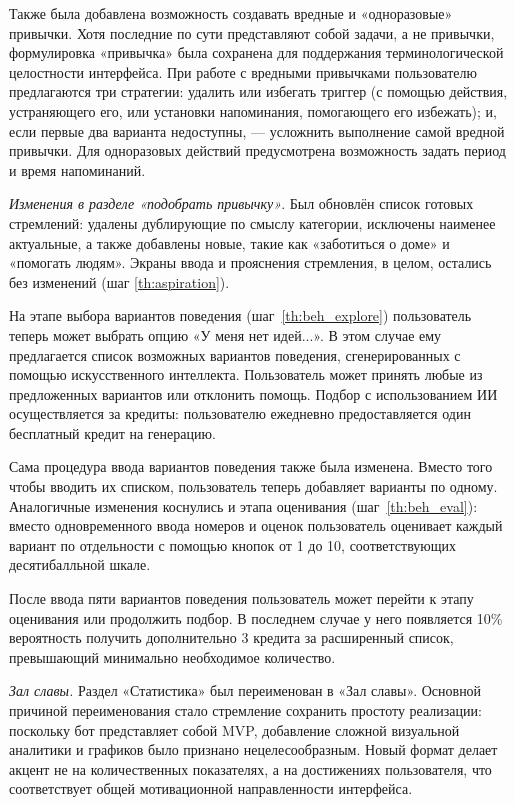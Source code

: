 \documentclass[pdflatex,sn-mathphys-num]{sn-jnl}%
\theoremstyle{thmstyleone}%
\theoremstyle{thmstyletwo}%
\theoremstyle{thmstylethree}%
\begin{document}
Также была добавлена возможность создавать вредные и «одноразовые» привычки. Хотя последние по сути представляют собой задачи, а не привычки, формулировка «привычка» была сохранена для поддержания терминологической целостности интерфейса. При работе с вредными привычками пользователю предлагаются три стратегии: удалить или избегать триггер (с помощью действия, устраняющего его, или установки напоминания, помогающего его избежать); и, если первые два варианта недоступны, — усложнить выполнение самой вредной привычки. Для одноразовых действий предусмотрена возможность задать период и время напоминаний.

\textit{Изменения в разделе «подобрать привычку»}. Был обновлён список готовых стремлений: удалены дублирующие по смыслу категории, исключены наименее актуальные, а также добавлены новые, такие как «заботиться о доме» и «помогать людям». Экраны ввода и прояснения стремления, в целом, остались без изменений (шаг \ref{th:aspiration}).

На этапе выбора вариантов поведения (шаг~\ref{th:beh_explore}) пользователь теперь может выбрать опцию «У меня нет идей...». В этом случае ему предлагается список возможных вариантов поведения, сгенерированных с помощью искусственного интеллекта. Пользователь может принять любые из предложенных вариантов или отклонить помощь. Подбор с использованием ИИ осуществляется за кредиты: пользователю ежедневно предоставляется один бесплатный кредит на генерацию.

Сама процедура ввода вариантов поведения также была изменена. Вместо того чтобы вводить их списком, пользователь теперь добавляет варианты по одному. Аналогичные изменения коснулись и этапа оценивания (шаг~\ref{th:beh_eval}): вместо одновременного ввода номеров и оценок пользователь оценивает каждый вариант по отдельности с помощью кнопок от 1 до 10, соответствующих десятибалльной шкале.

После ввода пяти вариантов поведения пользователь может перейти к этапу оценивания или продолжить подбор. В последнем случае у него появляется 10\% вероятность получить дополнительно 3 кредита за расширенный список, превышающий минимально необходимое количество.

\textit{Зал славы.} Раздел «Статистика» был переименован в «Зал славы». Основной причиной переименования стало стремление сохранить простоту реализации: поскольку бот представляет собой MVP, добавление сложной визуальной аналитики и графиков было признано нецелесообразным. Новый формат делает акцент не на количественных показателях, а на достижениях пользователя, что соответствует общей мотивационной направленности интерфейса.
\end{document}
